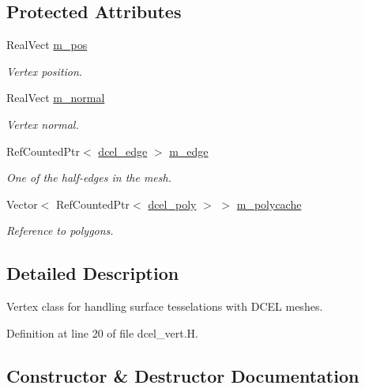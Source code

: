 \subsection*{Protected Attributes}
\begin{DoxyCompactItemize}
\item 
Real\+Vect \hyperlink{classdcel__vert_a837cb5cc7a7bc802a9a372a9e6d9263a}{m\+\_\+pos}
\begin{DoxyCompactList}\small\item\em Vertex position. \end{DoxyCompactList}\item 
Real\+Vect \hyperlink{classdcel__vert_ab976d55b4d7db7b7d6e9244d5e10393e}{m\+\_\+normal}
\begin{DoxyCompactList}\small\item\em Vertex normal. \end{DoxyCompactList}\item 
Ref\+Counted\+Ptr$<$ \hyperlink{classdcel__edge}{dcel\+\_\+edge} $>$ \hyperlink{classdcel__vert_aaad0f353e3298fd625126a15f66322ea}{m\+\_\+edge}
\begin{DoxyCompactList}\small\item\em One of the half-\/edges in the mesh. \end{DoxyCompactList}\item 
Vector$<$ Ref\+Counted\+Ptr$<$ \hyperlink{classdcel__poly}{dcel\+\_\+poly} $>$ $>$ \hyperlink{classdcel__vert_a93d796da8f2519f6e9d8ff0197f6e673}{m\+\_\+polycache}
\begin{DoxyCompactList}\small\item\em Reference to polygons. \end{DoxyCompactList}\end{DoxyCompactItemize}


\subsection{Detailed Description}
Vertex class for handling surface tesselations with D\+C\+EL meshes. 

Definition at line 20 of file dcel\+\_\+vert.\+H.



\subsection{Constructor \& Destructor Documentation}
